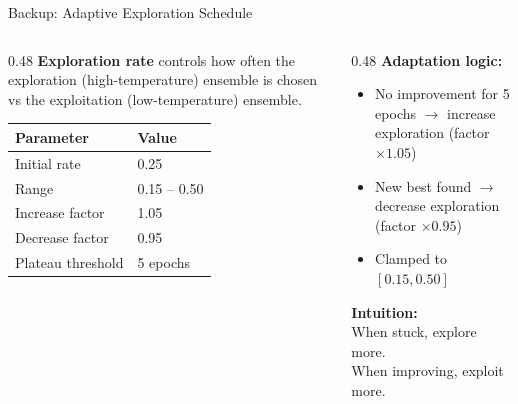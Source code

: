 \documentclass[aspectratio=169,12pt]{beamer}
\begin{document}
\begin{frame}{Backup: Adaptive Exploration Schedule}
  \begin{columns}[T]
    \begin{column}{0.48\textwidth}
      \textbf{Exploration rate} controls how often the exploration
      (high-temperature) ensemble is chosen vs the exploitation
      (low-temperature) ensemble.

      \vspace{0.5em}
      \begin{table}
        \footnotesize
        \begin{tabular}{@{}ll@{}}
          \toprule
          Parameter & Value \\
          \midrule
          Initial rate & 0.25 \\
          Range & 0.15 -- 0.50 \\
          Increase factor & 1.05 \\
          Decrease factor & 0.95 \\
          Plateau threshold & 5 epochs \\
          \bottomrule
        \end{tabular}
      \end{table}
    \end{column}
    \begin{column}{0.48\textwidth}
      \textbf{Adaptation logic:}
      \begin{itemize}
        \item No improvement for 5 epochs $\to$ increase exploration
              (factor $\times 1.05$)
        \item New best found $\to$ decrease exploration
              (factor $\times 0.95$)
        \item Clamped to $[0.15, 0.50]$
      \end{itemize}

      \vspace{0.5em}
      \textbf{Intuition:}\\
      When stuck, explore more.\\
      When improving, exploit more.
    \end{column}
  \end{columns}
\end{frame}
\end{document}
